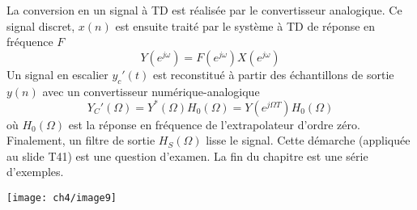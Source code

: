 	La conversion en un signal à TD est réalisée par le convertisseur analogique. Ce signal 
	discret, $x(n)$ est ensuite traité par le système à TD de réponse en fréquence $F$
	\begin{equation}
	Y(e^{j\omega}) = F(e^{j\omega})X(e^{j\omega})
	\end{equation}
	Un signal en escalier $y_c'(t)$ est reconstitué à partir des échantillons de sortie $y(n)$ 
	avec un convertisseur numérique-analogique
	\begin{equation}
	Y_C'(\Omega) = Y^*(\Omega)H_0(\Omega) = Y(e^{j\Omega T})H_0(\Omega)
	\end{equation}
	où $H_0(\Omega)$ est la réponse en fréquence de l'extrapolateur d'ordre zéro. Finalement, 
	un filtre de sortie $H_S(\Omega)$ lisse le signal. Cette démarche (appliquée au slide T41) 
	est une question d'examen.  La fin du chapitre est une série d'exemples.\\

	\begin{center}
		\texttt{[image: ch4/image9]}
\end{center}
	
	
	
	
	
	
	
	
	
	
	
	
	
	
	
	
	
	
	
	
	
	
	
	
	
	
	
	
	
